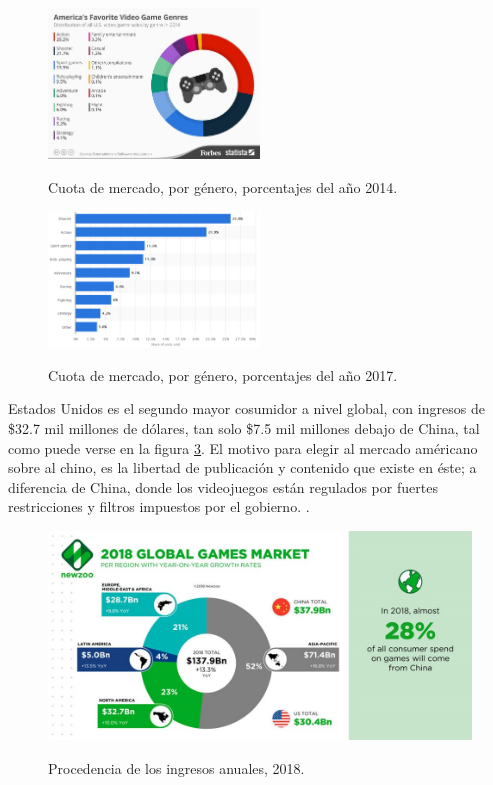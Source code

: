 \documentclass[]{article}
\begin{document}
\begin{figure}[H]
	
	\centering
	\includegraphics[width=0.5\textwidth]{Picture1}
	\caption{Cuota de mercado, por g\'enero, porcentajes del a\~no 2014.} 
	\label{fig:FORB}
	\cite{Forbes}
	
	
\end{figure}

\begin{figure}[H]
	
	\centering
	\includegraphics[width=0.5\textwidth]{statista-2}
	\caption{Cuota de mercado, por g\'enero, porcentajes del a\~no 2017.  } 
	\label{fig:STAT}
	\cite{Statista}
	
	
\end{figure}

 Estados Unidos es el segundo mayor cosumidor a nivel global, con ingresos de \$32.7 mil millones de d\'olares, tan solo \$7.5 mil millones debajo de China, tal como puede verse en la figura \ref{NWZOO}.
 El motivo para elegir al mercado am\'ericano sobre al chino, es la libertad de publicaci\'on y contenido que existe en \'este; a diferencia de China, donde los videojuegos est\'an regulados por fuertes restricciones y filtros impuestos por el gobierno. \cite{china1}.

\begin{figure}[H]
	
	\centering
	\includegraphics[width=1\textwidth]{GGM2}
	\caption{Procedencia de los ingresos anuales, 2018.  } \cite{Newzoo} 
	\label{NWZOO}
	
\end{figure}
\end{document}
